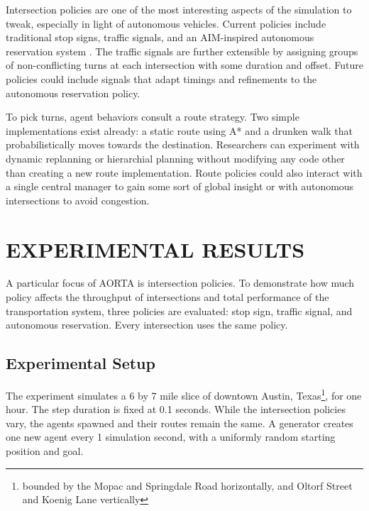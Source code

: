 \documentclass[letterpaper, 10 pt, conference]{ieeeconf}  %
\begin{document}
Intersection policies are one of the most interesting aspects of the simulation
to tweak, especially in light of autonomous vehicles. Current policies include
traditional stop signs, traffic signals, and an AIM-inspired autonomous
reservation system \cite{JAIR08-dresner}. The traffic signals are further
extensible by assigning groups of non-conflicting turns at each intersection
with some duration and offset. Future policies could include signals that adapt
timings and refinements to the autonomous reservation policy.

To pick turns, agent behaviors consult a route strategy. Two simple
implementations exist already: a static route using A* \cite{astar} and a
drunken walk that probabilistically moves towards the destination.  Researchers
can experiment with dynamic replanning or hierarchial planning without modifying
any code other than creating a new route implementation. Route policies could
also interact with a single central manager to gain some sort of global insight or
with autonomous intersections to avoid congestion.


\section{EXPERIMENTAL RESULTS}
\label{sec:results}

A particular focus of AORTA is intersection policies. To demonstrate how much
policy affects the throughput of intersections and total performance of the
transportation system, three policies are evaluated: stop sign, traffic signal,
and autonomous reservation. Every intersection uses the same policy.

\subsection{Experimental Setup}

The experiment simulates a 6 by 7 mile slice of downtown Austin,
Texas\footnote{bounded by the Mopac and Springdale Road horizontally, and Oltorf
Street and Koenig Lane vertically}, for one hour. The step duration is fixed at
0.1 seconds. While the intersection policies vary, the agents spawned and their
routes remain the same. A generator creates one new agent every 1 simulation
second, with a uniformly random starting position and goal.
\end{document}
